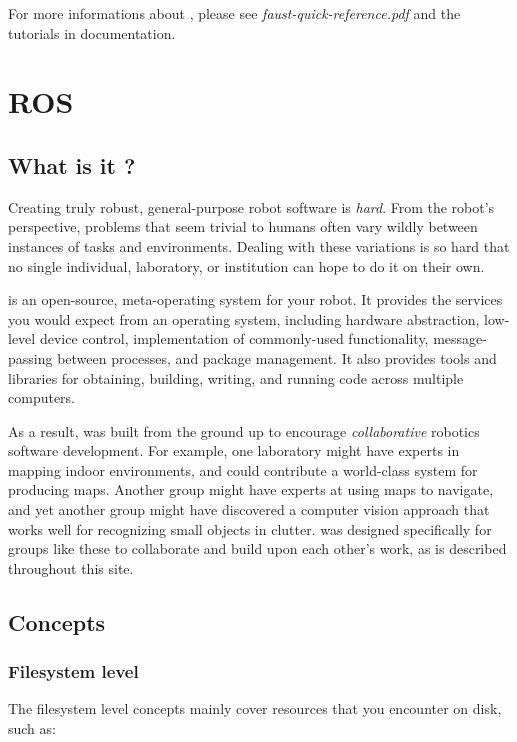 For more informations about \faust, please see \textit{faust-quick-reference.pdf} and the tutorials in \faust documentation.

\section{ROS}
\subsection{What is it ?}
 Creating truly robust, general-purpose robot software is \textit {hard}. From the robot's perspective, problems that seem trivial to humans often vary wildly between instances of tasks and environments. Dealing with these variations is so hard that no single individual, laboratory, or institution can hope to do it on their own. \newline

\ros is an open-source, meta-operating system for your robot. It provides the services you would expect from an operating system, including hardware abstraction, low-level device control, implementation of commonly-used functionality, message-passing between processes, and package management. It also provides tools and libraries for obtaining, building, writing, and running code across multiple computers. \newline

As a result, \ros was built from the ground up to encourage \textit{collaborative} robotics software development. For example, one laboratory might have experts in mapping indoor environments, and could contribute a world-class system for producing maps. Another group might have experts at using maps to navigate, and yet another group might have discovered a computer vision approach that works well for recognizing small objects in clutter. \ros was designed specifically for groups like these to collaborate and build upon each other's work, as is described throughout this site.\\

\subsection{Concepts}
\subsubsection{Filesystem level}
The filesystem level concepts mainly cover \ros resources that you encounter on disk, such as:

